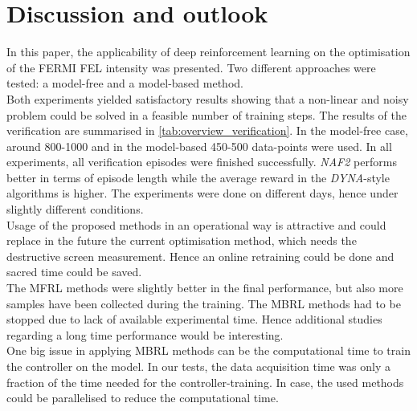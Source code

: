 \documentclass[
reprint,
amsmath,amssymb,amsfonts,clevref,
aps,
prstab,
]{revtex4-2}
\begin{document}
	\section{Discussion and outlook}
	In this paper, the applicability of deep reinforcement learning on the optimisation of the FERMI FEL intensity was presented. Two different approaches were tested: a model-free and a model-based method.\\
	Both experiments yielded satisfactory results showing that a non-linear and noisy problem could be solved in a feasible number of training steps. The results of the verification are summarised in \cref{tab:overview_verification}. In the model-free case, around 800-1000 and in the model-based 450-500 data-points were used. In all experiments, all verification episodes were finished successfully. \emph{NAF2} performs better in terms of episode length while the average reward in the \emph{DYNA}-style algorithms is higher. The experiments were done on different days, hence under slightly different conditions.\\
	Usage of the proposed methods in an operational way is attractive and could replace in the future the current optimisation method, which needs the destructive screen measurement. Hence an online retraining could be done and sacred time could be saved.\\ 
	The MFRL methods were slightly better in the final performance, but also more samples have been collected during the training. The MBRL methods had to be stopped due to lack of available experimental time. Hence additional studies regarding a long time performance would be interesting.\\ One big issue in applying MBRL methods can be the computational time to train the controller on the model. In our tests, the data acquisition time was only a fraction of the time needed for the controller-training. In case, the used methods could be parallelised to reduce the computational time.
\end{document}
